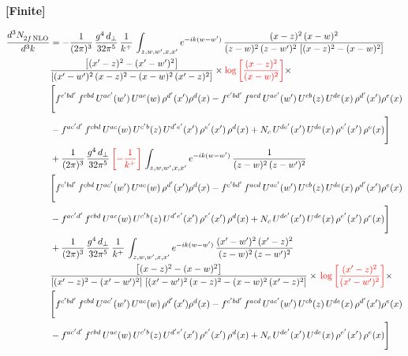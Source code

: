 \documentclass[9pt]{article}
\numberwithin{equation}{section}
\begin{document}
\par\smallskip\noindent\textbf{[Finite]}\par\nobreak
\begin{align}
    \frac{d^{3}N_{2f\,\rm NLO}^{\rm}}{d^{3}k}  & =   - \frac{1}{(2\pi)^{3}}\, \frac{g^{4}\,d_{\perp}}{32\pi^{5}}\,\frac{1}{k^{+}}\,\int_{z,w,w^{\prime},x,x'} e^{-ik(w-w^{\prime})}\,\frac{(x-z)^{2}\, (x-w)^{2}}{(z-w)^{2}\, (z-w')^{2}\,\left[(x-z)^{2} - (x-w)^{2}\right]}\notag \\ & \frac{\left[(x'-z)^{2}-(x'-w')^{2}\right]}{\left[(x'-w')^{2}\, (x-z)^{2} - (x-w)^{2}\, (x'-z)^{2}\right]}\times {\color{red}\log{\left[\frac{(x-z)^{2}}{(x-w)^{2}}\right]}}\times\notag \\ & \Bigg[f^{c'bd'}\,f^{cbd}\, U^{ac'}(w')\,U^{ac}(w)\,\rho^{d'}(x')\rho^{d}(x)- f^{c'bd'}\,f^{acd}\,U^{ac'}(w')\,U^{cb}(z)\,U^{de}(x)\,\rho^{d'}(x')\rho^{e}(x) \notag \\ & -f^{ac'd'}\,f^{cbd}\,U^{ac}(w)\,U^{c'b}(z)\,U^{d'e'}(x')\,\rho^{e'}(x')\,\rho^{d}(x) +N_{c}\,U^{de'}(x')\,U^{de}(x)\,\rho^{e'}(x')\,\rho^{e}(x)\Bigg]  \notag \\
& + \frac{1}{(2\pi)^{3}}\, \frac{g^{4}\,d_{\perp}}{32\pi^{5}}\,{\color{red}\left[- \frac{1}{k^{+}}\right]}\,\int_{z,w,w^{\prime},x,x'} e^{-ik(w-w^{\prime})}\,\frac{1}{(z-w)^{2}\, (z-w')^{2}}\notag \\ & \Bigg[f^{c'bd'}\,f^{cbd}\, U^{ac'}(w')\,U^{ac}(w)\,\rho^{d'}(x')\rho^{d}(x)- f^{c'bd'}\,f^{acd}\,U^{ac'}(w')\,U^{cb}(z)\,U^{de}(x)\,\rho^{d'}(x')\rho^{e}(x) \notag \\ & -f^{ac'd'}\,f^{cbd}\,U^{ac}(w)\,U^{c'b}(z)\,U^{d'e'}(x')\,\rho^{e'}(x')\,\rho^{d}(x) +N_{c}\,U^{de'}(x')\,U^{de}(x)\,\rho^{e'}(x')\,\rho^{e}(x)\Bigg]  \notag \\
& + \frac{1}{(2\pi)^{3}}\, \frac{g^{4}\,d_{\perp}}{32\pi^{5}}\,\frac{1}{k^{+}}\,\int_{z,w,w^{\prime},x,x'} e^{-ik(w-w^{\prime})}\,\frac{(x'-w')^{2}\, (x'-z)^{2}}{(z-w)^{2}\, (z-w')^{2}}\notag \\ & \frac{\left[(x-z)^{2} - (x-w)^{2}\right]}{\left[(x'-z)^{2} - (x'-w')^{2}\right]\, \left[(x'-w')^{2}\, (x - z)^{2} - (x-w)^{2}\,(x'-z)^{2}\right]}\times\, {\color{red}\log{\left[\frac{(x'-z)^{2}}{(x'-w')^{2}}\right]}}\times \notag \\ &  \Bigg[f^{c'bd'}\,f^{cbd}\, U^{ac'}(w')\,U^{ac}(w)\,\rho^{d'}(x')\rho^{d}(x)- f^{c'bd'}\,f^{acd}\,U^{ac'}(w')\,U^{cb}(z)\,U^{de}(x)\,\rho^{d'}(x')\rho^{e}(x) \notag \\ & -f^{ac'd'}\,f^{cbd}\,U^{ac}(w)\,U^{c'b}(z)\,U^{d'e'}(x')\,\rho^{e'}(x')\,\rho^{d}(x) +N_{c}\,U^{de'}(x')\,U^{de}(x)\,\rho^{e'}(x')\,\rho^{e}(x)\Bigg]
\end{align}
\end{document}
